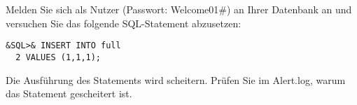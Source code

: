     \item Melden Sie sich als Nutzer  (Passwort: Welcome01\#) an Ihrer Datenbank an und versuchen Sie das folgende SQL-Statement abzusetzen:
    \begin{lstlisting}[language=oracle_sql]
&SQL>& INSERT INTO full
  2 VALUES (1,1,1);
    \end{lstlisting}
    Die Ausführung des Statements wird scheitern. Prüfen Sie im Alert.log, warum das Statement gescheitert ist.
